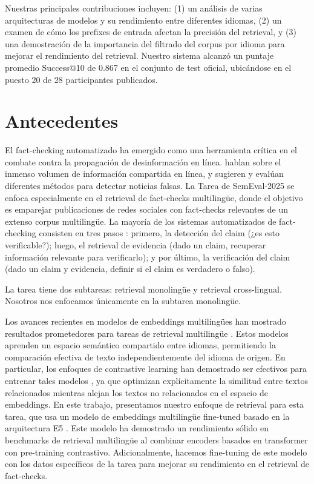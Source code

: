 \documentclass[11pt]{article}
\begin{document}
Nuestras principales contribuciones incluyen: (1) un análisis de varias arquitecturas de modelos y su rendimiento entre diferentes idiomas, (2) un examen de cómo los prefixes de entrada afectan la precisión del retrieval, y (3) una demostración de la importancia del filtrado del corpus por idioma para mejorar el rendimiento del retrieval. Nuestro sistema alcanzó un puntaje promedio Success@10 de 0.867 en el conjunto de test oficial, ubicándose en el puesto 20 de 28 participantes publicados.

\section{Antecedentes}

El fact-checking automatizado ha emergido como una herramienta crítica en el combate contra la propagación de desinformación en línea. \cite{zhou2020fakenews} hablan sobre el inmenso volumen de información compartida en línea, y sugieren y evalúan diferentes métodos para detectar noticias falsas. La Tarea de SemEval-2025 \cite{semeval2025task7} se enfoca especialmente en el retrieval de fact-checks multilingüe, donde el objetivo es emparejar publicaciones de redes sociales con fact-checks relevantes de un extenso corpus multilingüe.
La mayoría de los sistemas automatizados de fact-checking consisten en
tres pasos \cite{guo2022survey}: primero, la detección del claim (¿es esto verificable?); luego, el retrieval de evidencia (dado un claim, recuperar información relevante para verificarlo); y por último, la verificación del claim (dado un claim y evidencia, definir si el claim es verdadero o falso).

La tarea \cite{semeval2025task7} tiene dos subtareas: retrieval monolingüe y retrieval cross-lingual. Nosotros nos enfocamos únicamente en la subtarea monolingüe.

Los avances recientes en modelos de embeddings multilingües han mostrado resultados prometedores para tareas de retrieval multilingüe \cite{feng2022languageagnosticbertsentenceembedding, litschko2022crosslingual}. Estos modelos aprenden un espacio semántico compartido entre idiomas, permitiendo la comparación efectiva de texto independientemente del idioma de origen. En particular, los enfoques de contrastive learning han demostrado ser efectivos para entrenar tales modelos \cite{chen2020simple}, ya que optimizan explícitamente la similitud entre textos relacionados mientras alejan los textos no relacionados en el espacio de embeddings.
En este trabajo, presentamos nuestro enfoque de retrieval para esta tarea, que usa un modelo de embeddings multilingüe fine-tuned basado en la arquitectura E5 \cite{wang2024multilingual}. Este modelo ha demostrado un rendimiento sólido en benchmarks de retrieval multilingüe \cite{zhang2021mrtydimultilingualbenchmark} al combinar encoders basados en transformer con pre-training contrastivo. Adicionalmente, hacemos fine-tuning de este modelo con los datos específicos de la tarea para mejorar su rendimiento en el retrieval de fact-checks.
\end{document}
